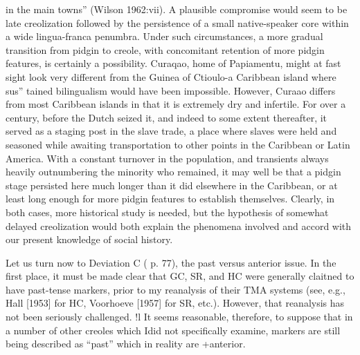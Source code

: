 in the main towns'' (Wilson 1962:vii). A plausible compromise would seem to be late creolization followed by the persistence of a small native-speaker core within a wide lingua-franca penumbra. Under such circumstances, a more gradual transition from pidgin to creole, with concomitant retention of more pidgin features, is certainly a possibility. Curaqao, home of Papiamentu, might at fast sight look very different from the Guinea of Ctioulo-a Caribbean island where sus'' tained bilingualism would have been impossible. However, Curaao differs from most Caribbean islands in that it is extremely dry and infertile. For over a century, before the Dutch seized it, and indeed to some extent thereafter, it served as a staging post in the slave trade, a place where slaves were held and seasoned while awaiting trans\-portation to other points in the Caribbean or Latin America. With a constant turnover in the population, and transients always heavily outnumbering the minority who remained, it may well be that a pidgin stage persisted here much longer than it did elsewhere in the Caribbean, or at least long enough for more pidgin features to establish themselves. Clearly, in both cases, more historical study is needed, but the hypothe\-sis of somewhat delayed creolization would both explain the phe\-nomena involved and accord with our present knowledge of social
history.



Let us turn now to Deviation C ( p. 77), the past versus anterior issue. In the first place, it must be made clear that GC, SR, and HC were generally claitned to have past-tense markers, prior to my re\-analysis of their TMA systems (see, e.g., Hall [1953] for HC, Voorhoeve [1957] for SR, etc.). However, that reanalysis has not been seriously challenged. !l It seems reasonable, therefore, to suppose that in a number of other creoles which Idid not specifically examine, markers are still being described as ``past'' which in reality are +anterior.

